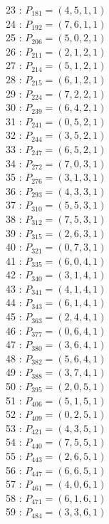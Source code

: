\documentclass{article}
\begin{document}
{\begin{multicols}{3}
23 : $P_{181}=( 4, 5, 1, 1 )$\\
24 : $P_{192}=( 7, 6, 1, 1 )$\\
25 : $P_{206}=( 5, 0, 2, 1 )$\\
26 : $P_{211}=( 2, 1, 2, 1 )$\\
27 : $P_{214}=( 5, 1, 2, 1 )$\\
28 : $P_{215}=( 6, 1, 2, 1 )$\\
29 : $P_{224}=( 7, 2, 2, 1 )$\\
30 : $P_{239}=( 6, 4, 2, 1 )$\\
31 : $P_{241}=( 0, 5, 2, 1 )$\\
32 : $P_{244}=( 3, 5, 2, 1 )$\\
33 : $P_{247}=( 6, 5, 2, 1 )$\\
34 : $P_{272}=( 7, 0, 3, 1 )$\\
35 : $P_{276}=( 3, 1, 3, 1 )$\\
36 : $P_{293}=( 4, 3, 3, 1 )$\\
37 : $P_{310}=( 5, 5, 3, 1 )$\\
38 : $P_{312}=( 7, 5, 3, 1 )$\\
39 : $P_{315}=( 2, 6, 3, 1 )$\\
40 : $P_{321}=( 0, 7, 3, 1 )$\\
41 : $P_{335}=( 6, 0, 4, 1 )$\\
42 : $P_{340}=( 3, 1, 4, 1 )$\\
43 : $P_{341}=( 4, 1, 4, 1 )$\\
44 : $P_{343}=( 6, 1, 4, 1 )$\\
45 : $P_{363}=( 2, 4, 4, 1 )$\\
46 : $P_{377}=( 0, 6, 4, 1 )$\\
47 : $P_{380}=( 3, 6, 4, 1 )$\\
48 : $P_{382}=( 5, 6, 4, 1 )$\\
49 : $P_{388}=( 3, 7, 4, 1 )$\\
50 : $P_{395}=( 2, 0, 5, 1 )$\\
51 : $P_{406}=( 5, 1, 5, 1 )$\\
52 : $P_{409}=( 0, 2, 5, 1 )$\\
53 : $P_{421}=( 4, 3, 5, 1 )$\\
54 : $P_{440}=( 7, 5, 5, 1 )$\\
55 : $P_{443}=( 2, 6, 5, 1 )$\\
56 : $P_{447}=( 6, 6, 5, 1 )$\\
57 : $P_{461}=( 4, 0, 6, 1 )$\\
58 : $P_{471}=( 6, 1, 6, 1 )$\\
59 : $P_{484}=( 3, 3, 6, 1 )$\\

\end{multicols}}
\end{document}
